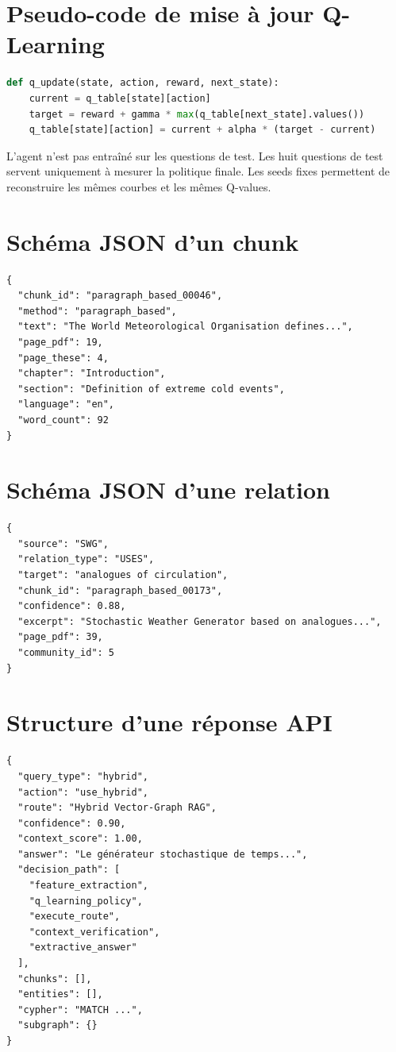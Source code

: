\documentclass[12pt,a4paper,oneside]{report}
\begin{document}
\begin{appendices}
\section{Pseudo-code de mise à jour Q-Learning}
\begin{lstlisting}[style=code,language=Python]
def q_update(state, action, reward, next_state):
    current = q_table[state][action]
    target = reward + gamma * max(q_table[next_state].values())
    q_table[state][action] = current + alpha * (target - current)
\end{lstlisting}

L'agent n'est pas entraîné sur les questions de test. Les huit questions de test servent uniquement à mesurer la politique finale. Les seeds fixes permettent de reconstruire les mêmes courbes et les mêmes Q-values.

\section{Schéma JSON d'un chunk}
\begin{lstlisting}[style=code]
{
  "chunk_id": "paragraph_based_00046",
  "method": "paragraph_based",
  "text": "The World Meteorological Organisation defines...",
  "page_pdf": 19,
  "page_these": 4,
  "chapter": "Introduction",
  "section": "Definition of extreme cold events",
  "language": "en",
  "word_count": 92
}
\end{lstlisting}

\section{Schéma JSON d'une relation}
\begin{lstlisting}[style=code]
{
  "source": "SWG",
  "relation_type": "USES",
  "target": "analogues of circulation",
  "chunk_id": "paragraph_based_00173",
  "confidence": 0.88,
  "excerpt": "Stochastic Weather Generator based on analogues...",
  "page_pdf": 39,
  "community_id": 5
}
\end{lstlisting}

\section{Structure d'une réponse API}
\begin{lstlisting}[style=code]
{
  "query_type": "hybrid",
  "action": "use_hybrid",
  "route": "Hybrid Vector-Graph RAG",
  "confidence": 0.90,
  "context_score": 1.00,
  "answer": "Le générateur stochastique de temps...",
  "decision_path": [
    "feature_extraction",
    "q_learning_policy",
    "execute_route",
    "context_verification",
    "extractive_answer"
  ],
  "chunks": [],
  "entities": [],
  "cypher": "MATCH ...",
  "subgraph": {}
}
\end{lstlisting}


\end{appendices}
\end{document}
